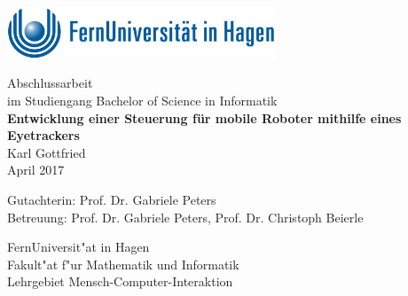 \begin{titlepage}
\sffamily

\noindent%
\begin{minipage}{12cm}
\includegraphics[width=8cm]{bilder/titelseite/fu-signet-rgb}
\end{minipage}

\vspace*{4cm}%
\noindent\hspace*{1cm}%
\begin{minipage}{13cm}
\large
\begin{center}
{\Large Abschlussarbeit} \\
{\large im Studiengang Bachelor of Science in Informatik} \\
\vspace*{1cm}
\textbf{Entwicklung einer Steuerung für mobile Roboter mithilfe eines Eyetrackers} \\ %
\vspace*{1cm}
Karl Gottfried\\
April 2017
\end{center}
\end{minipage}
\normalsize

\vspace*{6.6cm}%
\noindent%
\begin{minipage}[b]{12cm}
\raggedright
Gutachterin: Prof. Dr. Gabriele Peters\\
Betreuung: Prof. Dr. Gabriele Peters, Prof. Dr. Christoph Beierle\\
\end{minipage}

\vspace*{2.5cm}%
\noindent%
\begin{minipage}[b]{12cm}
\raggedright
FernUniversit"at in Hagen \\
Fakult"at f"ur Mathematik und Informatik \\
Lehrgebiet Mensch-Computer-Interaktion \\
\end{minipage}
\end{titlepage}
